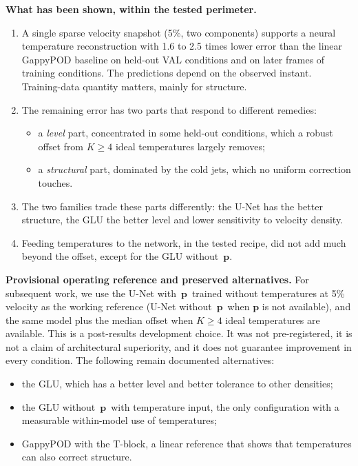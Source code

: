 \documentclass[11pt,letterpaper]{article}
\newcommand{\pon}{with~$\mathbf{p}$}
\newcommand{\poff}{without~$\mathbf{p}$}
\begin{document}
\textbf{What has been shown, within the tested perimeter.}
\begin{enumerate}
  \item A single sparse velocity snapshot (5\%, two components) supports a neural temperature reconstruction with 1.6 to 2.5 times lower error than the linear GappyPOD baseline on held-out VAL conditions and on later frames of training conditions. The predictions depend on the observed instant. Training-data quantity matters, mainly for structure.
  \item The remaining error has two parts that respond to different remedies:
  \begin{itemize}
    \item a \emph{level} part, concentrated in some held-out conditions, which a robust offset from $K\ge4$ ideal temperatures largely removes;
    \item a \emph{structural} part, dominated by the cold jets, which no uniform correction touches.
  \end{itemize}
  \item The two families trade these parts differently: the U-Net has the better structure, the GLU the better level and lower sensitivity to velocity density.
  \item Feeding temperatures to the network, in the tested recipe, did not add much beyond the offset, except for the GLU \poff.
\end{enumerate}

\textbf{Provisional operating reference and preserved alternatives.} For subsequent work, we use the U-Net \pon\ trained without temperatures at 5\% velocity as the working reference (U-Net \poff\ when $\mathbf{p}$ is not available), and the same model plus the median offset when $K\ge4$ ideal temperatures are available. This is a post-results development choice. It was not pre-registered, it is not a claim of architectural superiority, and it does not guarantee improvement in every condition. The following remain documented alternatives:
\begin{itemize}
  \item the GLU, which has a better level and better tolerance to other densities;
  \item the GLU \poff\ with temperature input, the only configuration with a measurable within-model use of temperatures;
  \item GappyPOD with the T-block, a linear reference that shows that temperatures can also correct structure.
\end{itemize}
\end{document}
